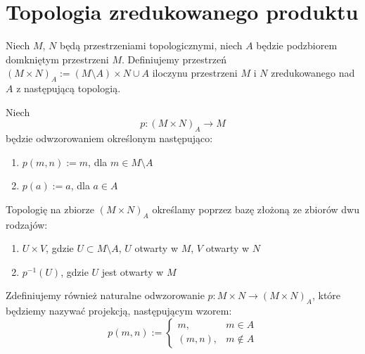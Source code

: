 \section{Topologia zredukowanego produktu}
\begin{df}
  Niech $M$, $N$ będą przestrzeniami topologicznymi, niech $A$ będzie podzbiorem domkniętym przestrzeni $M$. Definiujemy przestrzeń $(M \times N)_A := (M \setminus A) \times N \cup A$ iloczynu przestrzeni $M$ i $N$ zredukowanego nad $A$ z następującą topologią.
  
  Niech
  \[
    p: (M \times N)_A \rightarrow M
  \]
  będzie odwzorowaniem określonym następująco:
  \begin{enumerate}
    \item $p(m, n) := m$, dla $m \in M \setminus A$
    \item $p(a) := a$, dla $a \in A$
  \end{enumerate}
  
  Topologię na zbiorze $(M \times N)_A$ określamy poprzez bazę złożoną ze zbiorów dwu rodzajów:
  \begin{enumerate}
    \item $U \times V$, gdzie $U \subset M \setminus A$, $U$ otwarty w $M$, $V$ otwarty w $N$
    \item $p^{-1}(U)$, gdzie $U$ jest otwarty w $M$
  \end{enumerate}
  
  Zdefiniujemy również naturalne odwzorowanie $p: M\times N \to (M\times N)_A$, które będziemy nazywać projekcją, następującym wzorem:
  \[
    p(m,n) := \begin{cases}
      m,& m\in A \\
      (m,n),& m\not\in A
    \end{cases}
  \]
\end{df}


